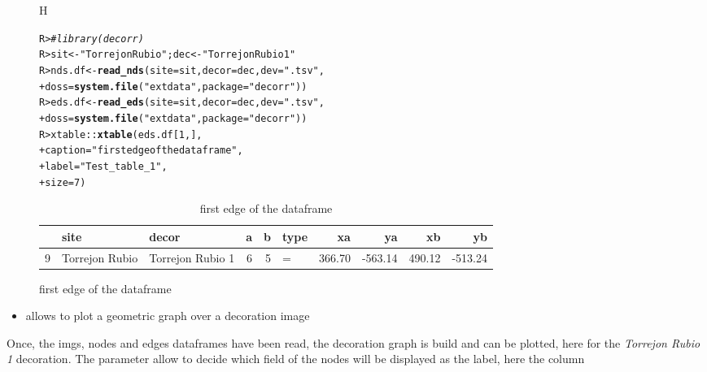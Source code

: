 \documentclass[article]{jss}\usepackage[]{graphicx}\usepackage[]{color}
\makeatletter
\newcommand{\hlnum}[1]{\textcolor[rgb]{0.686,0.059,0.569}{#1}}%
\newcommand{\hlstr}[1]{\textcolor[rgb]{0.192,0.494,0.8}{#1}}%
\newcommand{\hlcom}[1]{\textcolor[rgb]{0.678,0.584,0.686}{\textit{#1}}}%
\newcommand{\hlopt}[1]{\textcolor[rgb]{0,0,0}{#1}}%
\newcommand{\hlstd}[1]{\textcolor[rgb]{0.345,0.345,0.345}{#1}}%
\newcommand{\hlkwb}[1]{\textcolor[rgb]{0.69,0.353,0.396}{#1}}%
\newcommand{\hlkwc}[1]{\textcolor[rgb]{0.333,0.667,0.333}{#1}}%
\newcommand{\hlkwd}[1]{\textcolor[rgb]{0.737,0.353,0.396}{\textbf{#1}}}%
\newenvironment{kframe}{%
 \def\at@end@of@kframe{}%
 \ifinner\ifhmode%
  \def\at@end@of@kframe{\end{minipage}}%
  \begin{minipage}{\columnwidth}%
 \fi\fi%
 \def\FrameCommand##1{\hskip\@totalleftmargin \hskip-\fboxsep
 \colorbox{shadecolor}{##1}\hskip-\fboxsep
     \hskip-\linewidth \hskip-\@totalleftmargin \hskip\columnwidth}%
 \MakeFramed {\advance\hsize-\width
   \@totalleftmargin\z@ \linewidth\hsize
   \@setminipage}}%
 {\par\unskip\endMakeFramed%
 \at@end@of@kframe}
\makeatother
\begin{document}
\begin{figure}{H}
\centering
\begin{kframe}
\begin{alltt}
\hlstd{R> }\hlcom{# library(decorr)}
\hlstd{R> }\hlstd{sit} \hlkwb{<-} \hlstr{"Torrejon Rubio"} \hlstd{; dec} \hlkwb{<-} \hlstr{"Torrejon Rubio 1"}
\hlstd{R> }\hlstd{nds.df} \hlkwb{<-} \hlkwd{read_nds}\hlstd{(}\hlkwc{site} \hlstd{= sit,} \hlkwc{decor} \hlstd{= dec,} \hlkwc{dev} \hlstd{=} \hlstr{".tsv"}\hlstd{,}
\hlstd{+ }                   \hlkwc{doss} \hlstd{=} \hlkwd{system.file}\hlstd{(}\hlstr{"extdata"}\hlstd{,} \hlkwc{package} \hlstd{=} \hlstr{"decorr"}\hlstd{))}
\hlstd{R> }\hlstd{eds.df} \hlkwb{<-} \hlkwd{read_eds}\hlstd{(}\hlkwc{site} \hlstd{= sit,} \hlkwc{decor} \hlstd{= dec,} \hlkwc{dev} \hlstd{=} \hlstr{".tsv"}\hlstd{,}
\hlstd{+ }                   \hlkwc{doss} \hlstd{=} \hlkwd{system.file}\hlstd{(}\hlstr{"extdata"}\hlstd{,} \hlkwc{package} \hlstd{=} \hlstr{"decorr"}\hlstd{))}
\hlstd{R> }\hlstd{xtable}\hlopt{::}\hlkwd{xtable}\hlstd{(eds.df[}\hlnum{1}\hlstd{,],}
\hlstd{+ }               \hlkwc{caption}\hlstd{=}\hlstr{"first edge of the dataframe"}\hlstd{,}
\hlstd{+ }               \hlkwc{label}\hlstd{=}\hlstr{"Test_table_1"}\hlstd{,}
\hlstd{+ }               \hlkwc{size}\hlstd{=}\hlnum{7}\hlstd{)}
\end{alltt}
\end{kframe}%
\begin{table}[ht]
\centering
\begin{tabular}{rllrrlrrrr}
  \hline
 & site & decor & a & b & type & xa & ya & xb & yb \\ 
  \hline
9 & Torrejon Rubio & Torrejon Rubio 1 &   6 &   5 & = & 366.70 & -563.14 & 490.12 & -513.24 \\ 
   \hline
\end{tabular}
\caption{first edge of the dataframe} 
\label{Test_table_1}
\end{table}

\end{figure}

\begin{itemize}
  \item {} allows to plot a geometric graph over a decoration image
\end{itemize}

Once, the imgs, nodes and edges dataframes have been read, the decoration graph is build and can be plotted, here for the \emph{Torrejon Rubio 1} decoration. The  parameter allow to decide which field of the nodes will be displayed as the label, here the column 
\end{document}
